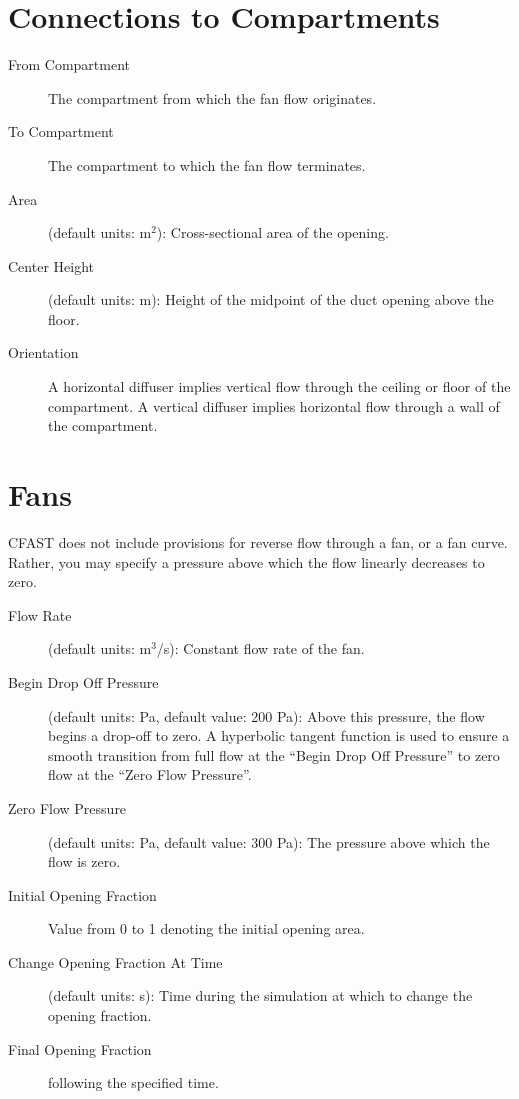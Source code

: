 \section{Connections to Compartments}

\begin{description}
\item[From Compartment] The compartment from which the fan flow originates.
\item[To Compartment] The compartment to which the fan flow terminates.
\item[Area] (default units: m$^2$): Cross-sectional area of the opening.
\item[Center Height] (default units: m): Height of the midpoint of the duct opening above the floor.
\item[Orientation] A horizontal diffuser implies vertical flow through the ceiling or floor of the compartment.  A vertical diffuser implies horizontal flow through a wall of the compartment.
\end{description}

\section{Fans}

CFAST does not include provisions for reverse flow through a fan, or a fan curve. Rather, you may specify a pressure above which the flow linearly decreases to zero.
\begin{description}
\item[Flow Rate] (default units: m$^3$/s): Constant flow rate of the fan.
\item[Begin Drop Off Pressure] (default units: Pa, default value: 200 Pa): Above this pressure, the flow begins a drop-off to zero. A hyperbolic tangent function is used to ensure a smooth transition from full flow at the ``Begin Drop Off Pressure'' to zero flow at the ``Zero Flow Pressure''.
\item[Zero Flow Pressure] (default units: Pa, default value: 300 Pa): The pressure above which the flow is zero.
\item[Initial Opening Fraction] Value from 0 to 1 denoting the initial opening area.
\item[Change Opening Fraction At Time] (default units: s): Time during the simulation at which to change the opening fraction.
\item[Final Opening Fraction] following the specified time.
\end{description}


